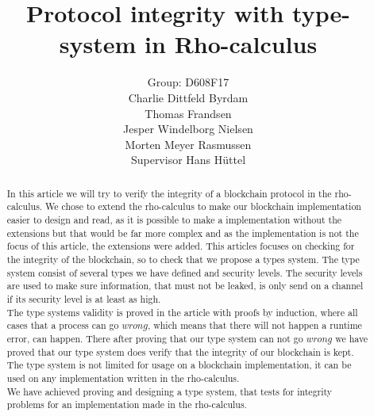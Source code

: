\mainmatter  %

\title{Protocol integrity with type-system in Rho-calculus}




\author{Group: D608F17\\Charlie Dittfeld Byrdam\\Thomas Frandsen\\Jesper Windelborg Nielsen\\Morten Meyer Rasmussen\\Supervisor Hans Hüttel}




\toctitle{}
\tocauthor{}
\maketitle
\begin{abstract}
In this article we will try to verify the integrity of a blockchain protocol in the rho-calculus. We chose to extend the rho-calculus to make our blockchain implementation easier to design and read, as it is possible to make a implementation without the extensions but that would be far more complex and as the implementation is not the focus of this article, the extensions were added. This articles focuses on checking for the integrity of the blockchain, so to check that we propose a types system. The type system consist of several types we have defined and security levels. The security levels are used to make sure information, that must not be leaked, is only send on a channel if its security level is at least as high.\\
    The type systems validity is proved in the article with proofs by induction, where all cases that a process can go \ensuremath{wrong}, which means that there will not happen a runtime error, can happen. There after proving that our type system can not go \ensuremath{wrong} we have proved that our type system does verify that the integrity of our blockchain is kept. The type system is not limited for usage on a blockchain implementation, it can be used on any implementation written in the rho-calculus.\\
We have achieved proving and designing a type system, that tests for integrity problems for an implementation made in the rho-calculus.
\end{abstract}
\clearpage
